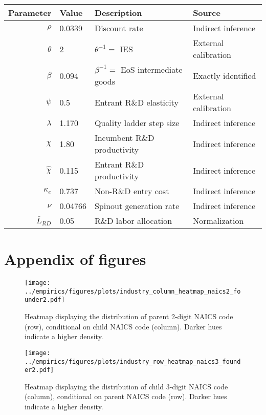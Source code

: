 \documentclass[11pt,english]{article}
\begin{document}
\begin{table}[!htb]
	\centering
	\label{calibration_2_parameters}
	\begin{tabular}{rlll}
		\toprule \toprule
		Parameter & Value & Description & Source \tabularnewline
		\midrule
		$\rho$ & 0.0339 & Discount rate  & Indirect inference \tabularnewline
		$\theta$ & 2 & $\theta^{-1} = $ IES & External calibration 
		\tabularnewline
		$\beta$ & 0.094 & $\beta^{-1} = $ EoS intermediate goods & Exactly identified \tabularnewline 
		$\psi$ & 0.5 & Entrant R\&D elasticity & External calibration \tabularnewline
		$\lambda$ & 1.170 & Quality ladder step size & Indirect inference 
		\tabularnewline
		$\chi$ & 1.80 & Incumbent R\&D productivity & Indirect inference 
		\tabularnewline
		$\hat{\chi}$ & 0.115 & Entrant R\&D productivity & Indirect inference \tabularnewline 
		$\kappa_e$ & 0.737 & Non-R\&D entry cost & Indirect inference \tabularnewline
		$\nu$ & 0.04766 & Spinout generation rate  & Indirect inference\tabularnewline
		$\bar{L}_{RD}$ & 0.05 & R\&D labor allocation  & Normalization \tabularnewline
		\bottomrule
	\end{tabular}
\end{table}



\newpage
\section{Appendix of figures}

\setcounter{figure}{0}
\renewcommand{\thefigure}{\Alph{section}\arabic{figure}}

\begin{figure}[!htb]
	\centering
	\texttt{[image: ../empirics/figures/plots/industry\_column\_heatmap\_naics2\_founder2.pdf]}
	\caption{Heatmap displaying the distribution of parent 2-digit NAICS code (row), conditional on child NAICS code (column). Darker hues indicate a higher density.}
	\label{figure:industry_column_heatmap_naics2_founder2}
\end{figure}

\begin{figure}[!htb]
	\centering
	\texttt{[image: ../empirics/figures/plots/industry\_row\_heatmap\_naics3\_founder2.pdf]}
	\caption{Heatmap displaying the distribution of child 3-digit NAICS code (column), conditional on parent NAICS code (row). Darker hues indicate a higher density.}
	\label{figure:industry_row_heatmap_naics3_founder2}
\end{figure}
\end{document}
